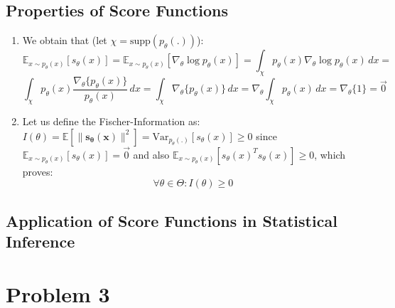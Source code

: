 \documentclass{article}
\begin{document}
\subsection{Properties of Score Functions}
\begin{enumerate}
\item 
We obtain that (let $\chi = \text{supp}( p_\theta(.))$):
\begin{equation*}
    \mathbb{E}_{x \sim p_\theta(x)} [s_\theta(x)] = \mathbb{E}_{x \sim p_\theta(x)} [ \nabla_\theta \log p_\theta(x)] = 
    \int_\chi p_\theta(x) \nabla_\theta \log p_\theta(x) \, dx = 
\end{equation*}
\begin{equation*}
    \int_\chi p_\theta(x) \frac{\nabla_\theta \{p_\theta(x)\}} {p_\theta(x)} \, dx = \int_\chi \nabla_\theta \{p_\theta(x)\} \, dx = 
    \nabla_\theta{\int_\chi p_\theta(x) \, dx} = \nabla_\theta \{1\} = \vec{0}
\end{equation*}
\item Let us define the Fischer-Information as: $I(\theta) = \mathbb{E} [ \| \mathbf{s_\theta(x)} \|^2 ] = \text{Var}_{p_\theta(.)}[s_\theta(x)] \geq 0$ since $ \mathbb{E}_{x \sim p_\theta(x)} [s_\theta(x)]=\vec{0}$ and also $\mathbb{E}_{x \sim p_\theta(x)} [s_\theta(x)^T s_\theta(x)] \geq 0$, which proves:
\begin{equation*}
    \forall \theta \in \Theta: I(\theta) \geq 0
\end{equation*}
\end{enumerate}
\subsection{Application of Score Functions in Statistical Inference}


\section{Problem 3}
\end{document}
